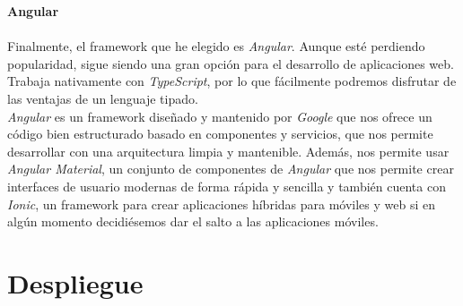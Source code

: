 \noindent \textbf{Angular}\\ \\
\indent Finalmente, el framework que he elegido es \textit{Angular}. Aunque esté perdiendo popularidad, sigue
siendo una gran opción para el desarrollo de aplicaciones web. Trabaja nativamente con \textit{TypeScript}, por lo que
fácilmente podremos disfrutar de las ventajas de un lenguaje tipado.\\

\textit{Angular} es un framework diseñado y mantenido por \textit{Google} que nos ofrece un código bien estructurado
basado en componentes y servicios, que nos permite desarrollar con una arquitectura limpia y mantenible. Además, nos
permite usar \textit{Angular Material}\cite{angularmaterial}, un conjunto de componentes de \textit{Angular} que nos
permite crear interfaces de usuario modernas de forma rápida y sencilla y también cuenta con \textit{Ionic}\cite{ionic},
un framework para crear aplicaciones híbridas para móviles y web si en algún momento decidiésemos dar el salto a las
aplicaciones móviles.\\

\section{Despliegue}\label{sec:despliegue}
